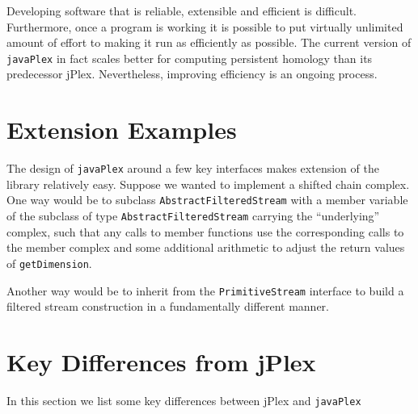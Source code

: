 \documentclass[11pt]{amsart}
\newcommand\javaPlex{\texttt{javaPlex}\xspace}
\begin{document}
Developing software that is reliable, extensible and efficient is difficult. Furthermore, once a program is working it is possible to put virtually unlimited amount of effort to making it run as efficiently as possible. The current version of \javaPlex in fact scales better for computing persistent homology than its predecessor jPlex. Nevertheless, improving efficiency is an ongoing process.

\section{Extension Examples}

The design of \javaPlex around a few key interfaces makes extension of the library relatively easy. Suppose we wanted to implement a shifted chain complex. One way would be to subclass \texttt{Abstract\-Filtered\-Stream} with a member variable of the subclass of type \texttt{Abstract\-Filtered\-Stream} carrying the ``underlying'' complex, such that any calls to member functions use the corresponding calls to the member complex and some additional arithmetic to adjust the return values of \texttt{getDimension}.

Another way would be to inherit from the \texttt{PrimitiveStream} interface to build a filtered stream construction in a fundamentally different manner.

\section{Key Differences from jPlex}

In this section we list some key differences between jPlex and \javaPlex
\end{document}
